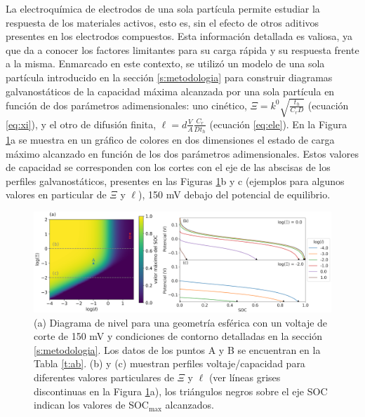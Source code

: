 La electroquímica de electrodos de una sola partícula \cite{ventosa2021, 
heubner2020, takahashi2020, wahab2020, xu2020, tao2019, fukui2011} permite 
estudiar la respuesta  de los materiales activos, esto es, sin el efecto 
de otros aditivos presentes en los electrodos compuestos. Esta información 
detallada es valiosa, ya que da a conocer los factores limitantes para su 
carga rápida y su respuesta frente a la misma. Enmarcado en este contexto, se utilizó un 
modelo de una sola partícula introducido en la sección \ref{s:metodologia} para construir 
diagramas galvanostáticos de la capacidad máxima alcanzada por una sola partícula 
en función de dos parámetros adimensionales: uno cinético,
$\Xi = k^0 \sqrt{\frac{t_h}{C_r D}}$ (ecuación \ref{eq:xi}),
y el otro de difusión finita, $\ell = d \frac{V}{A} \frac{C_r}{D t_h}$
(ecuación \ref{eq:ele}).  En la Figura \ref{fig:diagnostico}a se muestra en
un gráfico de colores en dos dimensiones el
estado de carga máximo alcanzado en función de los dos parámetros adimensionales. Estos valores 
de capacidad se corresponden con los cortes con el eje de las abscisas de los perfiles galvanostáticos, presentes en las
Figuras \ref{fig:diagnostico}b y c (ejemplos para algunos valores en particular 
de $\Xi$ y $\ell$), 150 mV debajo del potencial de equilibrio.
\begin{figure}[h!]
    \centering
    \includegraphics[width=\textwidth]{FastCharging/un/introduccion/diagnosis-merged.png}
    \caption{(a) Diagrama de nivel para una geometría esférica con un voltaje de 
    corte de 150 mV y condiciones de contorno detalladas en la sección 
    \ref{s:metodologia}. Los datos de los puntos A y B se encuentran en la 
    Tabla \ref{t:ab}. (b) y (c) muestran perfiles voltaje/capacidad para 
    diferentes valores particulares de $\Xi$ y $\ell$ (ver líneas grises 
    discontinuas en la Figura \ref{fig:diagnostico}a), los triángulos negros 
    sobre el eje SOC indican los valores de SOC$_{\max}$ alcanzados.}
    \label{fig:diagnostico}
\end{figure}

